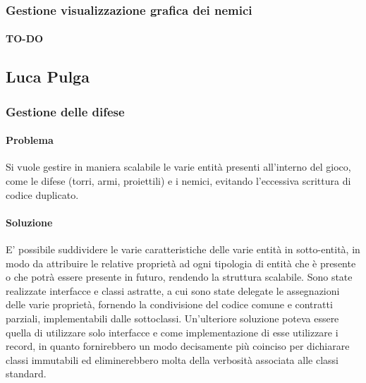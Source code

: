\documentclass[a4paper,12pt]{report}
\begin{document}
\subsubsection{Gestione visualizzazione grafica dei nemici}
\paragraph{TO-DO}


\newpage
\subsection{Luca Pulga}
\subsubsection{Gestione delle difese}
\paragraph{Problema}
Si vuole gestire in maniera scalabile le varie entità presenti all'interno del gioco, come le difese (torri, armi, proiettili) e i nemici, evitando l'eccessiva scrittura di codice duplicato.

\paragraph{Soluzione}
E' possibile suddividere le varie caratteristiche delle varie entità in sotto-entità, in modo da attribuire le relative proprietà ad ogni tipologia di entità che è presente
o che potrà essere presente in futuro, rendendo la struttura scalabile. Sono state realizzate interfacce e classi astratte, a cui sono state delegate le assegnazioni delle varie proprietà, fornendo la condivisione del codice comune e contratti parziali, implementabili dalle sottoclassi.
Un'ulteriore soluzione poteva essere quella di utilizzare solo interfacce e come implementazione di esse utilizzare i record, in quanto fornirebbero un modo decisamente più coinciso per dichiarare classi immutabili ed eliminerebbero molta della verbosità associata alle classi standard.
\end{document}
